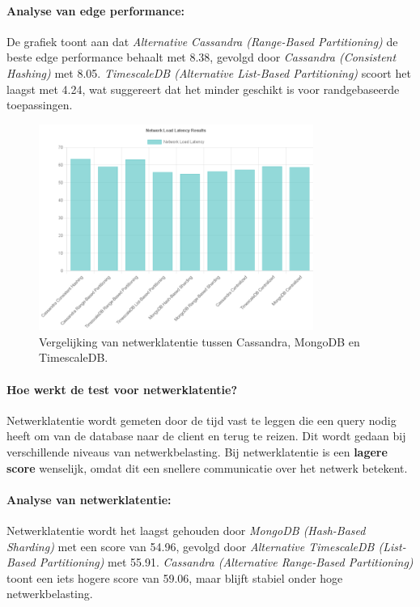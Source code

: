 \paragraph{Analyse van edge performance:}
De grafiek toont aan dat \textit{Alternative Cassandra (Range-Based Partitioning)} de beste edge performance behaalt met 8.38, gevolgd door \textit{Cassandra (Consistent Hashing)} met 8.05. \textit{TimescaleDB (Alternative List-Based Partitioning)} scoort het laagst met 4.24, wat suggereert dat het minder geschikt is voor randgebaseerde toepassingen.

\begin{figure}[H]
	\centering
	\includegraphics[width=0.8\textwidth]{Network_Load Latency.png}
	\caption{Vergelijking van netwerklatentie tussen Cassandra, MongoDB en TimescaleDB.}
	\label{fig:network-latency-comparison}
\end{figure}

\paragraph{Hoe werkt de test voor netwerklatentie?} 
Netwerklatentie wordt gemeten door de tijd vast te leggen die een query nodig heeft om van de database naar de client en terug te reizen. Dit wordt gedaan bij verschillende niveaus van netwerkbelasting. Bij netwerklatentie is een \textbf{lagere score} wenselijk, omdat dit een snellere communicatie over het netwerk betekent.

\paragraph{Analyse van netwerklatentie:}
Netwerklatentie wordt het laagst gehouden door \textit{MongoDB (Hash-Based Sharding)} met een score van 54.96, gevolgd door \textit{Alternative TimescaleDB (List-Based Partitioning)} met 55.91. \textit{Cassandra (Alternative Range-Based Partitioning)} toont een iets hogere score van 59.06, maar blijft stabiel onder hoge netwerkbelasting.

